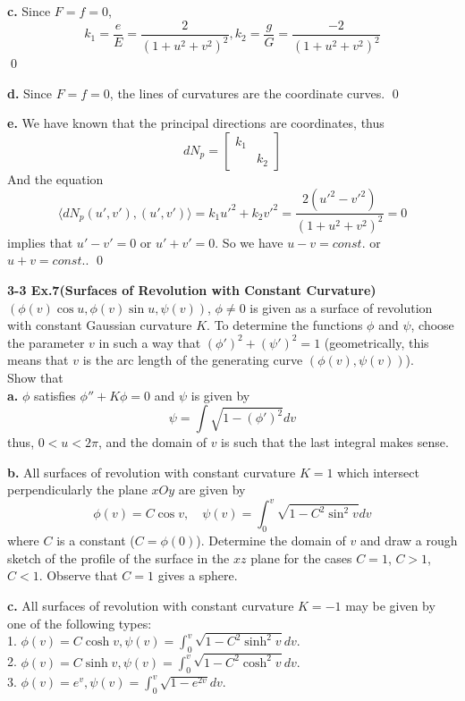 \documentclass{article}
\begin{document}
\par
\textbf{c. }Since $F=f=0$,
$$
    k_1 = \frac{e}{E} = \frac{2}{(1+u^2+v^2)^2},k_2 = \frac{g}{G} = \frac{-2}{(1+u^2+v^2)^2}
$$
\qed

\par
\textbf{d. }Since $F=f=0$, the lines of curvatures are the coordinate curves. \qed

\par
\textbf{e. }We have known that the principal directions are coordinates, thus
$$
    dN_p = \left[\begin{array}{cc}
        k_1 & \\
        & k_2
    \end{array}\right]
$$
And the equation
$$
    \langle dN_p(u',v'), (u',v') \rangle = k_1u'^2 + k_2v'^2 = \frac{2(u'^2-v'^2)}{(1+u^2+v^2)^2} = 0
$$
implies that $u'-v'=0$ or $u'+v'=0$. So we have $u - v = const.$ or $u + v = const.$. \qed

\par
\textbf{3-3 Ex.7(Surfaces of Revolution with Constant Curvature)}\\
$(\phi(v) \cos u, \phi(v) \sin u, \psi(v))$, $\phi \neq 0$ is given as a surface of
revolution with constant Gaussian curvature $K$. To determine the functions $\phi$
and $\psi$, choose the parameter $v$ in such a way that $(\phi')^2+(\psi')^2=1$
(geometrically, this means that $v$ is the arc length of the generating curve 
$(\phi(v), \psi(v))$). \\
Show that\\
\textbf{a. }$\phi$ satisfies $\phi'' + K \phi = 0$ and $\psi$ is given by
$$
    \psi = \int \sqrt{1 - (\phi')^2}dv
$$
thus, $0<u<2\pi$, and the domain of $v$ is such that the last integral makes sense.

\par
\textbf{b. }All surfaces of revolution with constant curvature $K=1$ which intersect
perpendicularly the plane $xOy$ are given by
$$
    \phi(v) = C\cos v, \quad \psi(v) = \int_0^v \sqrt{1-C^2 \sin^2v}dv
$$
where $C$ is a constant ($C = \phi(0)$). Determine the domain of $v$ and draw a
rough sketch of the profile of the surface in the $xz$ plane for the cases $C=1$,
$C>1$, $C<1$. Observe that $C=1$ gives a sphere.

\par
\textbf{c. }All surfaces of revolution with constant curvature $K=-1$ may be given
by one of the following types:\\
1. $\phi(v) = C\cosh v, \psi(v) = \int_0^v \sqrt{1-C^2 \sinh^2 v}dv.$\\
2. $\phi(v) = C\sinh v, \psi(v) = \int_0^v \sqrt{1-C^2 \cosh^2 v}dv.$\\
3. $\phi(v) = e^v, \psi(v) = \int_0^v \sqrt{1-e^{2v}}dv.$\\
\end{document}

